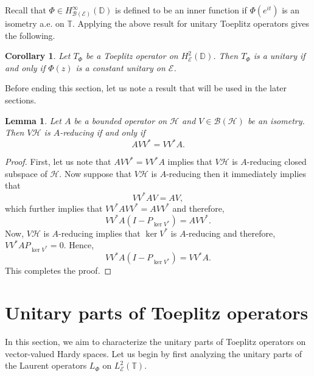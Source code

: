 \documentclass[12pt]{amsart}
\numberwithin{equation}{section}
\newtheorem{thm}[propn]{Theorem}
\newtheorem{lemma}[propn]{Lemma}
\newtheorem{cor}[propn]{Corollary}
\theoremstyle{definition}
\newcommand{\D}{\mathbb{D}}
\newcommand{\T}{\mathbb{T}}
\newcommand{\1}{{\mbox{\bf 1}}}
\newcommand{\clb}{\mathcal{B}}
\newcommand{\cle}{\mathcal{E}}
\newcommand{\clh}{\mathcal{H}}
\newcommand{\raro}{\rightarrow}
\begin{document}
Recall that $\Phi \in H_{\clb(\cle)}^{\infty}(\D)$ is defined to be an inner function if $\Phi(e^{it})$ is an isometry a.e. on $\T$. Applying the above result for unitary Toeplitz operators gives the following.
\begin{cor}\label{unitoep}
Let $T_{\Phi}$ be a Toeplitz operator on $H_{\cle}^2(\D)$. Then $T_{\Phi}$ is a unitary if and only if $\Phi(z)$ is a constant unitary on $\cle$.
\end{cor}
%
Before ending this section, let us note a result that will be used in the later sections.
\begin{lemma}\label{isom}
Let $A$ be a bounded operator on $\clh$ and $V \in \clb(\clh)$ be an isometry. Then $V \clh$ is $A$-reducing if and only if 
\[
A VV^* = VV^* A.
\]
\end{lemma}
\begin{proof}
First, let us note that $A VV^* = VV^* A$ implies that $V\clh$ is $A$-reducing closed subspace of $\clh$. Now suppose that $V\clh$ is $A$-reducing then it immediately implies that 
\[
VV^* A V = AV,
\]
which further implies that $VV^* A VV^* = AVV^*$ and therefore,
\[
VV^* A (I - P_{\ker V^*}) = AVV^*.
\]
Now, $V\clh$ is $A$-reducing implies that $\ker V^*$ is $A$-reducing and therefore, $VV^* A P_{\ker V^*} = 0$. Hence,
\[
VV^* A (I - P_{\ker V^*}) = VV^* A.
\]
This completes the proof.
\end{proof}



\section{Unitary parts of Toeplitz operators}\label{unitary}
In this section, we aim to characterize the unitary parts of Toeplitz operators on vector-valued Hardy spaces.  Let us begin by first analyzing the unitary parts of the Laurent operators $L_{\Phi}$ on $L_{\cle}^2(\T)$. 
\end{document}
